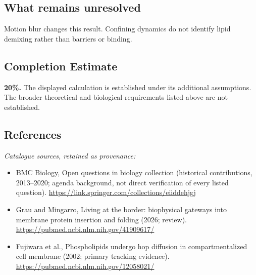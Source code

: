 \documentclass[11pt]{article}
\begin{document}
\subsection{What remains unresolved}
Motion blur changes this result. Confining dynamics do not identify lipid demixing rather than barriers or binding.
\subsection{Completion Estimate}
\textbf{20\%.} The displayed calculation is established under its additional assumptions. The broader theoretical and biological requirements listed above are not established.
\subsection{References}
\noindent\emph{Catalogue sources, retained as provenance:}
\begin{itemize}
\item BMC Biology, Open questions in biology collection (historical contributions, 2013--2020; agenda background, not direct verification of every listed question). \url{https://link.springer.com/collections/eiiddehjgj}
\item Grau and Mingarro, Living at the border: biophysical gateways into membrane protein insertion and folding (2026; review). \url{https://pubmed.ncbi.nlm.nih.gov/41909617/}
\item Fujiwara et al., Phospholipids undergo hop diffusion in compartmentalized cell membrane (2002; primary tracking evidence). \url{https://pubmed.ncbi.nlm.nih.gov/12058021/}
\end{itemize}
\clearpage


\appendix
\end{document}
